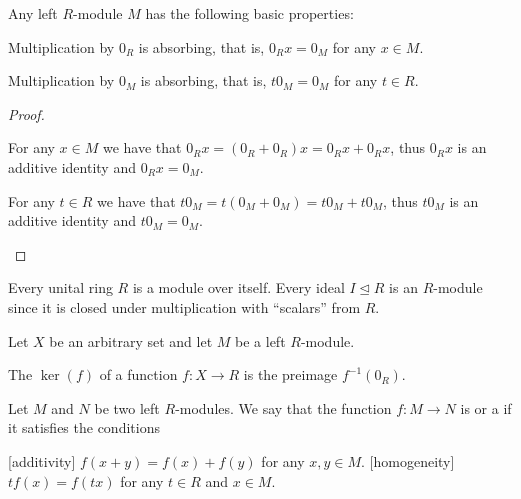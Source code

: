 \begin{proposition}\label{def:left_module_properties}
  Any left \( R \)-module \( M \) has the following basic properties:
  \begin{defenum}
     Multiplication by \( 0_R \) is absorbing, that is, \( 0_R x = 0_M \) for any \( x \in M \).

     Multiplication by \( 0_M \) is absorbing, that is, \( t 0_M = 0_M \) for any \( t \in R \).
  \end{defenum}
\end{proposition}
\begin{proof}\mbox{}
  \begin{itemize}
     For any \( x \in M \) we have that \( 0_R x = (0_R + 0_R)x = 0_R x + 0_R x \), thus \( 0_R x \) is an additive identity and \( 0_R x = 0_M \).

     For any \( t \in R \) we have that \( t 0_M = t (0_M + 0_M) = t 0_M + t 0_M \), thus \( t 0_M \) is an additive identity and \( t 0_M = 0_M \).
  \end{itemize}
\end{proof}

\begin{example}\label{ex:module/ideal_of_ring}
  Every unital ring \( R \) is a module over itself. Every ideal \( I \unlhd R \) is an \( R \)-module since it is closed under multiplication with \enquote{scalars} from \( R \).
\end{example}

\begin{definition}\label{def:left_module_kernel}
  Let \( X \) be an arbitrary set and let \( M \) be a left \( R \)-module.

  The  \( \ker(f) \) of a function \( f: X \to R \) is the preimage \( f^{-1}(0_R) \).
\end{definition}

\begin{definition}\label{def:linear_operator}
  Let \( M \) and \( N \) be two left \( R \)-modules. We say that the function \( f: M \to N \) is  or a  if it satisfies the conditions
  \begin{description}
    [additivity] \( f(x + y) = f(x) + f(y) \) for any \( x, y \in M \).
    [homogeneity] \( t f(x) = f(tx) \) for any \( t \in R \) and \( x \in M \).
  \end{description}
\end{definition}

